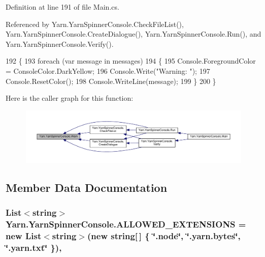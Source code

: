 Definition at line 191 of file Main.\-cs.



Referenced by Yarn.\-Yarn\-Spinner\-Console.\-Check\-File\-List(), Yarn.\-Yarn\-Spinner\-Console.\-Create\-Dialogue(), Yarn.\-Yarn\-Spinner\-Console.\-Run(), and Yarn.\-Yarn\-Spinner\-Console.\-Verify().


\begin{DoxyCode}
192         \{
193             \textcolor{keywordflow}{foreach} (var message \textcolor{keywordflow}{in} messages)
194             \{
195                 Console.ForegroundColor = ConsoleColor.DarkYellow;
196                 Console.Write(\textcolor{stringliteral}{"Warning: "});
197                 Console.ResetColor();
198                 Console.WriteLine(message);
199             \}
200         \}
\end{DoxyCode}


Here is the caller graph for this function\-:
\nopagebreak
\begin{figure}[H]
\begin{center}
\leavevmode
\includegraphics[width=350pt]{a00172_a979bb6f049b6c5294f745a19e24ddd9d_icgraph}
\end{center}
\end{figure}




\subsection{Member Data Documentation}
\hypertarget{a00172_a0979de7ea02c8c0375b8220a12e6575e}{
\subsubsection[{A\-L\-L\-O\-W\-E\-D\-\_\-\-E\-X\-T\-E\-N\-S\-I\-O\-N\-S}]{\setlength{\rightskip}{0pt plus 5cm}List$<$string$>$ Yarn.\-Yarn\-Spinner\-Console.\-A\-L\-L\-O\-W\-E\-D\-\_\-\-E\-X\-T\-E\-N\-S\-I\-O\-N\-S = new List$<$string$>$(new string\mbox{[}$\,$\mbox{]} \{ \char`\"{}.node\char`\"{}, \char`\"{}.yarn.\-bytes\char`\"{}, \char`\"{}.yarn.\-txt\char`\"{} \})\hspace{0.3cm}{\ttfamily [static]}, {\ttfamily [package]}}}\label{a00172_a0979de7ea02c8c0375b8220a12e6575e}


